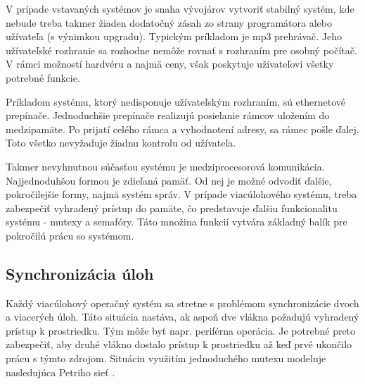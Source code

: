 V prípade vstavaných systémov je snaha vývojárov vytvoriť stabilný systém, kde nebude treba takmer žiaden dodatočný zásah zo strany programátora alebo užívateľa (s výnimkou upgradu). Typickým príkladom je mp3 prehrávač. Jeho užívateľské rozhranie sa rozhodne nemôže rovnať s rozhraním pre osobný počítač. V rámci možností hardvéru a najmä ceny, však poskytuje užívateľovi všetky potrebné funkcie. 

Príkladom systému, ktorý nedisponuje užívateľským rozhraním, sú ethernetové prepínače. Jednoduchšie prepínače realizujú posielanie rámcov uložením do medzipamäte. Po prijatí celého rámca a vyhodnotení adresy, sa rámec pošle ďalej. Toto všetko nevyžaduje žiadnu kontrolu od užívateľa.

Takmer nevyhnutnou súčasťou systému je medziprocesorová komunikácia. Najjednoduhšou formou je zdieľaná pamäť. Od nej je možné odvodiť ďalšie, pokročilejšie formy, najmä systém správ. V prípade viacúlohového systému, treba zabezpečiť vyhradený prístup do pamäte, čo predstavuje ďalšiu funkcionalitu systému - mutexy a semafóry. Táto množina funkcií vytvára základný balík pre pokročilú prácu so systémom.



\subsection{Synchronizácia úloh}

Každý viacúlohový operačný systém sa stretne s problémom synchronizácie dvoch a viacerých úloh. Táto situácia nastáva, ak aspoň dve vlákna požadujú vyhradený prístup k prostriedku. Tým môže byť napr. periférna operácia. Je potrebné preto zabezpečiť, aby druhé vlákno dostalo prístup k prostriedku až keď prvé ukončilo prácu s týmto zdrojom. Situáciu využitím jednoduchého mutexu modeluje nasledujúca Petriho sieť \cite{operacni_systemi}.

